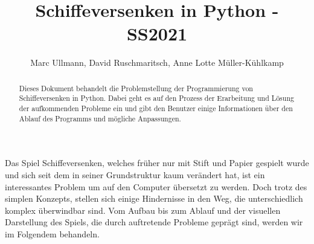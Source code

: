 \documentclass{llncs}
\begin{document}
%
%
%
\mainmatter              %
%
\title{Schiffeversenken in Python - SS2021}
%
\author{Marc Ullmann, David Ruschmaritsch, Anne Lotte Müller-Kühlkamp}
%

\maketitle              %

\begin{abstract}
Dieses Dokument behandelt die Problemstellung der Programmierung von Schiffeversenken in Python. Dabei geht es auf den Prozess der Erarbeitung und Lösung der aufkommenden Probleme ein und gibt den Benutzer einige Informationen über den Ablauf des Programms und mögliche Anpassungen.
\end{abstract}

Das Spiel Schiffeversenken, welches früher nur mit Stift und Papier gespielt wurde und sich seit dem in seiner Grundstruktur kaum verändert hat, ist ein interessantes Problem
um auf den Computer übersetzt zu werden. Doch trotz des simplen Konzepts, stellen sich einige Hindernisse in den Weg, die unterschiedlich komplex überwindbar sind. Vom Aufbau
bis zum Ablauf und der visuellen Darstellung des Spiels, die durch auftretende Probleme geprägt sind, werden wir im Folgendem behandeln.
\end{document}
